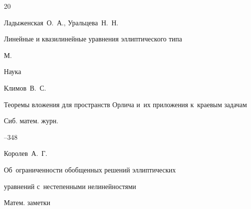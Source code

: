 \begin{thebibliography}{20}










\by Ладыженская~О.~А., Уральцева~Н.~Н.

\book Линейные и квазилинейные уравнения эллиптического типа

\publaddr М.

\publ Наука













\by Климов~В.~С.

\paper Теоремы вложения для пространств Орлича и~их приложения  к~краевым задачам

\jour Сиб. матем. журн.



--348







\by Королев~А.~Г.

\paper Об~ограниченности обобщенных решений эллиптических

уравнений с~нестепенными нелинейностями

\jour Матем. заметки



\end{thebibliography}
